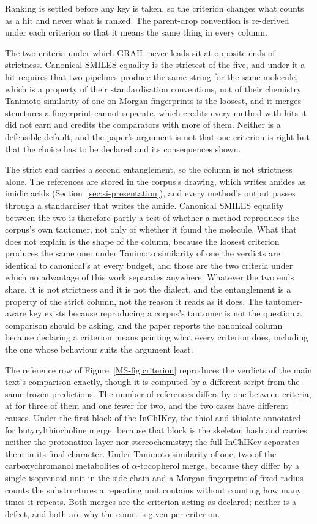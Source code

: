 \documentclass[journal=jcisd8,manuscript=suppinfo,layout=onecolumn]{achemso}
\begin{document}
Ranking is settled before any key is taken, so the criterion changes what counts as a hit and
never what is ranked. The parent-drop convention is re-derived under each criterion so that it
means the same thing in every column.

The two criteria under which GRAIL never leads sit at opposite ends of strictness. Canonical
SMILES equality is the strictest of the five, and under it a hit requires that two pipelines
produce the same string for the same molecule, which is a property of their standardisation
conventions, not of their chemistry. Tanimoto similarity of one on Morgan fingerprints is
the loosest, and it merges structures a fingerprint cannot separate, which credits every method
with hits it did not earn and credits the comparators with more of them. Neither is a defensible
default, and the paper's argument is not that one criterion is right but that the choice has to be
declared and its consequences shown.

The strict end carries a second entanglement, so the column is not strictness alone. The references
are stored in the corpus's drawing, which writes amides as
imidic acids (Section~\ref{sec:si-presentation}), and every method's output passes through a
standardiser that writes the amide. Canonical SMILES equality between the two is therefore partly
a test of whether a method reproduces the corpus's own tautomer, not only of whether it found
the molecule. What that does not explain is the shape of the column, because the loosest
criterion produces the same one: under Tanimoto similarity of one the verdicts are identical to
canonical's at every budget, and those are the two criteria under which no advantage of this
work separates anywhere. Whatever the two ends share, it is not strictness and it is not the
dialect, and the entanglement is a property of the strict column, not the reason it reads as it
does. The tautomer-aware key exists because
reproducing a corpus's tautomer is not the question a comparison should be asking, and the
paper reports the canonical column because declaring a criterion means printing what every
criterion does, including the one whose behaviour suits the argument least.

The reference row of Figure~\ref{MS-fig:criterion} reproduces the verdicts of the main text's
comparison exactly, though it is computed by a different script from the same frozen predictions.
The number of references differs by one between criteria, at \numPopulationReferences{} for three
of them and one fewer for two, and the two cases have different causes. Under the first block of
the InChIKey, the thiol and thiolate annotated for butyrylthiocholine merge, because that block is
the skeleton hash and carries neither the protonation layer nor stereochemistry; the full InChIKey
separates them in its final character. Under Tanimoto similarity of one, two of the carboxychromanol
metabolites of $\alpha$-tocopherol merge, because they differ by a single isoprenoid unit in the
side chain and a Morgan fingerprint of fixed radius counts the substructures a repeating unit
contains without counting how many times it repeats. Both
merges are the criterion acting as declared; neither is a defect, and both are why the count is
given per criterion.
\end{document}
